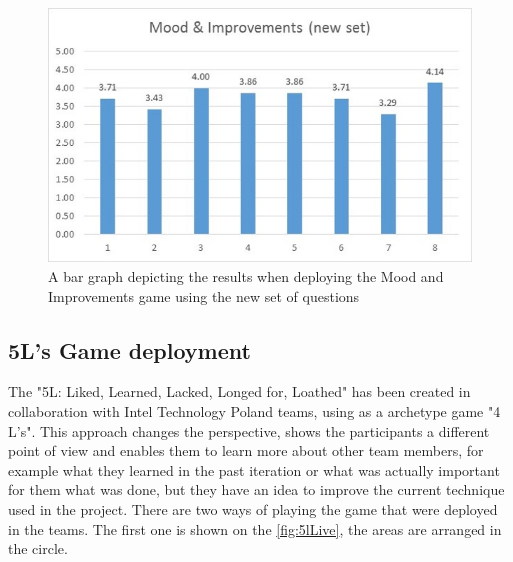 \begin{figure}[!htbp]
\caption{A bar graph depicting the results when deploying the Mood and Improvements game using the new set of questions}
\label{fig:moodResultsNew}
\centering
\includegraphics[width=1\textwidth]{charts/moodNewSet}
\end{figure}

\subsection{5L's Game deployment}
The "5L: Liked, Learned, Lacked, Longed for, Loathed" has been created in collaboration with Intel Technology Poland teams, using as a archetype game "4 L's". This approach changes the perspective, shows the participants a different point of view and enables them to learn more about other team members, for example what they learned in the past iteration or what was actually important for them what was done, but they have an idea to improve the current technique used in the project. There are two ways of playing the game that were deployed in the teams. The first one is shown on the \autoref{fig:5lLive}, the areas are arranged in the circle.

